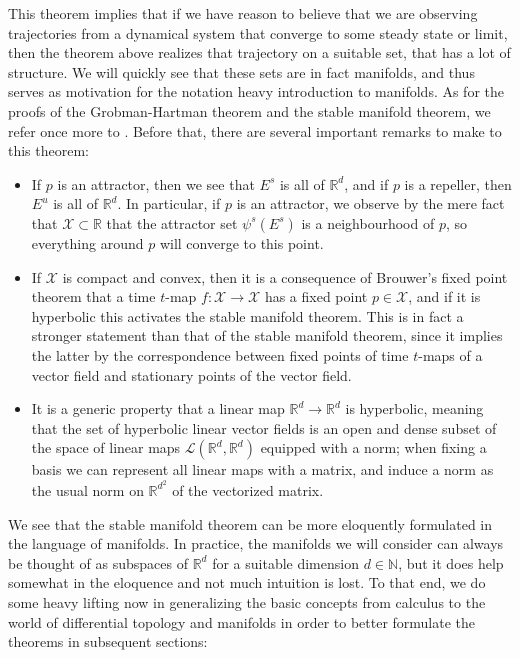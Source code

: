 \documentclass[11pt, a4paper]{memoir}
\theoremstyle{break}
\theoremstyle{break}
\theoremstyle{nonumberplain}
\newcommand{\mN}{\mathbb{N}}
\newcommand{\mR}{\mathbb{R}}
\begin{document}
This theorem implies that if we have reason to believe that we are observing trajectories from a dynamical system that converge to some steady state or limit, then the theorem above realizes that trajectory on a suitable set, that has a lot of structure. We will quickly see that these sets are in fact manifolds, and thus serves as motivation for the notation heavy introduction to manifolds. As for the proofs of the Grobman-Hartman theorem and the stable manifold theorem, we refer once more to \cite{Dynamics}. Before that, there are several important remarks to make to this theorem:
\begin{itemize}
	\item If $p$ is an attractor, then we see that $E^s$ is all of $\mR^d$, and if $p$ is a repeller, then $E^u$ is all of $\mR^d$. In particular, if $p$ is an attractor, we observe by the mere fact that $\mathcal{X}\subset \mR$ that the attractor set $\psi^s(E^s)$ is a neighbourhood of $p$, so everything around $p$ will converge to this point. 
	\item If $\mathcal{X}$ is compact and convex, then it is a consequence of Brouwer's fixed point theorem that a time $t$-map $f:\mathcal{X}\to\mathcal{X}$ has a fixed point $p\in \mathcal{X}$, and if it is hyperbolic this activates the stable manifold theorem. This is in fact a stronger statement than that of the stable manifold theorem, since it implies the latter by the correspondence between fixed points of time $t$-maps of a vector field and stationary points of the vector field.
	\item It is a generic property that a linear map $\mR^d\to\mR^d$ is hyperbolic, meaning that the set of hyperbolic linear vector fields is an open and dense subset of the space of linear maps $\mathcal{L}(\mR^d,\mR^d)$ equipped with a norm; when fixing a basis we can represent all linear maps with a matrix, and induce a norm as the usual norm on $\mR^{d^2}$ of the vectorized matrix.
\end{itemize}
We see that the stable manifold theorem can be more eloquently formulated in the language of manifolds. In practice, the manifolds we will consider can always be thought of as subspaces of $\mR^d$ for a suitable dimension $d\in \mN$, but it does help somewhat in the eloquence and not much intuition is lost. To that end, we do some heavy lifting now in generalizing the basic concepts from calculus to the world of differential topology and manifolds in order to better formulate the theorems in subsequent sections:
\end{document}
